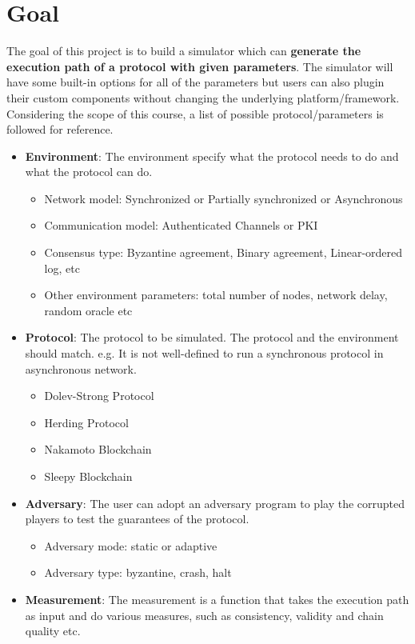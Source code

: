 \documentclass{article}
\begin{document}
	\section{Goal}
	
	The goal of this project is to build a simulator which can \textbf{generate the execution path of a protocol with given parameters}. The simulator will have some built-in options for all of the parameters but users can also plugin their custom components without changing the underlying platform/framework. Considering the scope of this course, a list of possible protocol/parameters is followed for reference.
	
	\begin{itemize}
		\item \textbf{Environment}: The environment specify what the protocol needs to do and what the protocol can do.
		\begin{itemize}
			\item Network model: Synchronized or Partially synchronized or Asynchronous
			\item Communication model: Authenticated Channels or PKI
			\item Consensus type: Byzantine agreement, Binary agreement, Linear-ordered log, etc
			\item Other environment parameters: total number of nodes, network delay, random oracle etc
		\end{itemize}
		\item \textbf{Protocol}: The protocol to be simulated. The protocol and the environment should match. e.g. It is not well-defined to run a synchronous protocol in asynchronous network.
		\begin{itemize}
			\item Dolev-Strong Protocol
			\item Herding Protocol
			\item Nakamoto Blockchain
			\item Sleepy Blockchain
		\end{itemize}
		\item \textbf{Adversary}: The user can adopt an adversary program to play the corrupted players to test the guarantees of the protocol.
		\begin{itemize}
			\item Adversary mode: static or adaptive
			\item Adversary type: byzantine, crash, halt
		\end{itemize}
		\item \textbf{Measurement}: The measurement is a function that takes the execution path as input and do various measures, such as consistency, validity and chain quality etc.
	\end{itemize}
	
\end{document}

